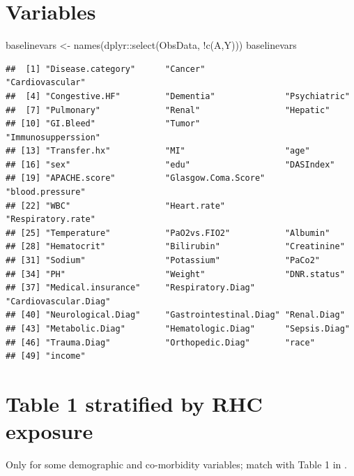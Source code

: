 \documentclass[
]{book}
\newenvironment{Shaded}{\begin{snugshade}}{\end{snugshade}}
\newcommand{\FunctionTok}[1]{\textcolor[rgb]{0.00,0.00,0.00}{#1}}
\newcommand{\NormalTok}[1]{#1}
\newcommand{\OtherTok}[1]{\textcolor[rgb]{0.56,0.35,0.01}{#1}}
\newcommand{\SpecialCharTok}[1]{\textcolor[rgb]{0.00,0.00,0.00}{#1}}
\begin{document}
\hypertarget{variables}{%
\section{Variables}\label{variables}}

\begin{Shaded}
\begin{Highlighting}[]
\NormalTok{baselinevars }\OtherTok{\textless{}{-}} \FunctionTok{names}\NormalTok{(dplyr}\SpecialCharTok{::}\FunctionTok{select}\NormalTok{(ObsData, }
                         \SpecialCharTok{!}\FunctionTok{c}\NormalTok{(A,Y)))}
\NormalTok{baselinevars}
\end{Highlighting}
\end{Shaded}

\begin{verbatim}
##  [1] "Disease.category"      "Cancer"                "Cardiovascular"       
##  [4] "Congestive.HF"         "Dementia"              "Psychiatric"          
##  [7] "Pulmonary"             "Renal"                 "Hepatic"              
## [10] "GI.Bleed"              "Tumor"                 "Immunosupperssion"    
## [13] "Transfer.hx"           "MI"                    "age"                  
## [16] "sex"                   "edu"                   "DASIndex"             
## [19] "APACHE.score"          "Glasgow.Coma.Score"    "blood.pressure"       
## [22] "WBC"                   "Heart.rate"            "Respiratory.rate"     
## [25] "Temperature"           "PaO2vs.FIO2"           "Albumin"              
## [28] "Hematocrit"            "Bilirubin"             "Creatinine"           
## [31] "Sodium"                "Potassium"             "PaCo2"                
## [34] "PH"                    "Weight"                "DNR.status"           
## [37] "Medical.insurance"     "Respiratory.Diag"      "Cardiovascular.Diag"  
## [40] "Neurological.Diag"     "Gastrointestinal.Diag" "Renal.Diag"           
## [43] "Metabolic.Diag"        "Hematologic.Diag"      "Sepsis.Diag"          
## [46] "Trauma.Diag"           "Orthopedic.Diag"       "race"                 
## [49] "income"
\end{verbatim}

\hypertarget{table-1-stratified-by-rhc-exposure}{%
\section{Table 1 stratified by RHC exposure}\label{table-1-stratified-by-rhc-exposure}}

Only for some demographic and co-morbidity variables; match with Table 1 in \citet{connors1996effectiveness}.
\end{document}
